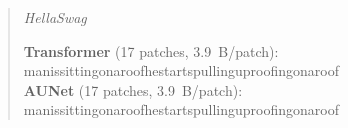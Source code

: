 \begin{quote}\footnotesize\ttfamily\raggedright\setlength{\emergencystretch}{3em}

{\centering
\textit{HellaSwag}\par
}
\textbf{Transformer} (17 patches, 3.9~B/patch):\\[1pt]
\allowbreak{}\bb{\textvisiblespace{}}\allowbreak{}m\allowbreak{}a\allowbreak{}n\allowbreak{}\bb{\textvisiblespace{}}\allowbreak{}i\allowbreak{}s\allowbreak{}\bb{\textvisiblespace{}}\allowbreak{}s\allowbreak{}i\allowbreak{}t\allowbreak{}t\allowbreak{}i\allowbreak{}n\allowbreak{}g\allowbreak{}\bb{\textvisiblespace{}}\allowbreak{}o\allowbreak{}n\allowbreak{}\bb{\textvisiblespace{}}\allowbreak{}a\allowbreak{}\bb{\textvisiblespace{}}\allowbreak{}r\allowbreak{}o\allowbreak{}o\allowbreak{}f\allowbreak{}\allowbreak{}\bb{\textvisiblespace{}}\allowbreak{}h\allowbreak{}e\allowbreak{}\bb{\textvisiblespace{}}\allowbreak{}s\allowbreak{}t\allowbreak{}a\allowbreak{}r\allowbreak{}t\allowbreak{}s\allowbreak{}\bb{\textvisiblespace{}}\allowbreak{}p\allowbreak{}u\allowbreak{}l\allowbreak{}l\allowbreak{}i\allowbreak{}n\allowbreak{}g\allowbreak{}\bb{\textvisiblespace{}}\allowbreak{}u\allowbreak{}p\allowbreak{}\bb{\textvisiblespace{}}\allowbreak{}r\allowbreak{}o\allowbreak{}o\allowbreak{}f\allowbreak{}i\allowbreak{}n\allowbreak{}g\allowbreak{}\bb{\textvisiblespace{}}\allowbreak{}o\allowbreak{}n\allowbreak{}\bb{\textvisiblespace{}}\allowbreak{}a\allowbreak{}\bb{\textvisiblespace{}}\allowbreak{}r\allowbreak{}o\allowbreak{}o\allowbreak{}f\allowbreak{}\allowbreak{}\\[6pt]
\textbf{AUNet} (17 patches, 3.9~B/patch):\\[1pt]
\allowbreak{}\bb{\textvisiblespace{}}\allowbreak{}m\allowbreak{}a\allowbreak{}n\allowbreak{}\bb{\textvisiblespace{}}\allowbreak{}i\allowbreak{}s\allowbreak{}\bb{\textvisiblespace{}}\allowbreak{}s\allowbreak{}i\allowbreak{}t\allowbreak{}t\allowbreak{}i\allowbreak{}n\allowbreak{}g\allowbreak{}\bb{\textvisiblespace{}}\allowbreak{}o\allowbreak{}n\allowbreak{}\bb{\textvisiblespace{}}\allowbreak{}a\allowbreak{}\bb{\textvisiblespace{}}\allowbreak{}r\allowbreak{}o\allowbreak{}o\allowbreak{}f\allowbreak{}\allowbreak{}\bb{\textvisiblespace{}}\allowbreak{}h\allowbreak{}e\allowbreak{}\bb{\textvisiblespace{}}\allowbreak{}s\allowbreak{}t\allowbreak{}a\allowbreak{}r\allowbreak{}t\allowbreak{}s\allowbreak{}\bb{\textvisiblespace{}}\allowbreak{}p\allowbreak{}u\allowbreak{}l\allowbreak{}l\allowbreak{}i\allowbreak{}n\allowbreak{}g\allowbreak{}\bb{\textvisiblespace{}}\allowbreak{}u\allowbreak{}p\allowbreak{}\bb{\textvisiblespace{}}\allowbreak{}r\allowbreak{}o\allowbreak{}o\allowbreak{}f\allowbreak{}i\allowbreak{}n\allowbreak{}g\allowbreak{}\bb{\textvisiblespace{}}\allowbreak{}o\allowbreak{}n\allowbreak{}\bb{\textvisiblespace{}}\allowbreak{}a\allowbreak{}\bb{\textvisiblespace{}}\allowbreak{}r\allowbreak{}o\allowbreak{}o\allowbreak{}f\allowbreak{}\allowbreak{}\\[6pt]

\end{quote}
